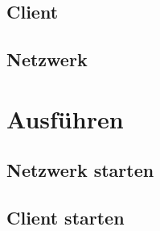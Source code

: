 \documentclass[parskip=full]{scrartcl}
\begin{document}
	\subsection{Client}
	
	
	\subsection{Netzwerk}
	
	\section{Ausführen}
	\subsection{Netzwerk starten}
	
	\subsection{Client starten}
		
\end{document}
